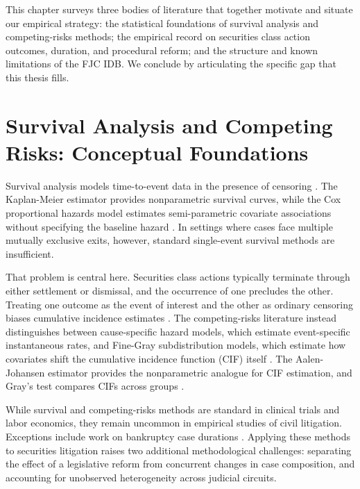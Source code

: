 
This chapter surveys three bodies of literature that together
motivate and situate our empirical strategy: the statistical
foundations of survival analysis and competing-risks methods;
the empirical record on securities class action outcomes,
duration, and procedural reform; and the structure and known
limitations of the FJC IDB. We conclude by articulating the specific gap that
this thesis fills.

\section{Survival Analysis and Competing Risks:
Conceptual Foundations}

Survival analysis models time-to-event data in the presence of
censoring \citep{kalbfleisch2002}. The Kaplan-Meier estimator
provides nonparametric survival curves, while the Cox
proportional hazards model estimates semi-parametric covariate
associations without specifying the baseline hazard
\citep{kaplan1958, cox1972}. In settings where cases face
multiple mutually exclusive exits, however, standard
single-event survival methods are insufficient.

That problem is central here. Securities class actions
typically terminate through either settlement or dismissal,
and the occurrence of one precludes the other. Treating one
outcome as the event of interest and the other as ordinary
censoring biases cumulative incidence estimates
\citep{putter2007}. The competing-risks literature instead
distinguishes between cause-specific hazard models, which
estimate event-specific instantaneous rates, and Fine-Gray
subdistribution models, which estimate how covariates shift
the cumulative incidence function (CIF) itself
\citep{fine1999}. The Aalen-Johansen estimator provides the
nonparametric analogue for CIF estimation, and Gray's test
compares CIFs across groups \citep{aalen1978, gray1988}.

While survival and competing-risks methods are standard in
clinical trials and labor economics, they remain uncommon in
empirical studies of civil litigation. Exceptions include work
on bankruptcy case durations \citep{dinterman2021,
dewaelheyns2009}. Applying these methods to securities
litigation raises two additional methodological challenges:
separating the effect of a legislative reform from concurrent
changes in case composition, and accounting for unobserved
heterogeneity across judicial circuits.

